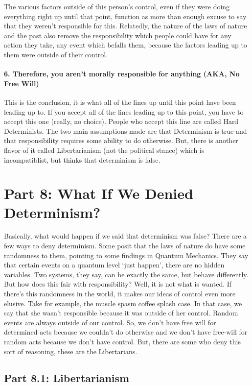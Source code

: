  The various factors outside of this person's control, even if they were doing everything right up until that point, function as more than enough excuse to say that they weren't responsible for this. Relatedly, the nature of the laws of nature and the past also remove the responsibility which people could have for any action they take, any event which befalls them, because the factors leading up to them were outside of their control.
\subsubsection{6. Therefore, you aren't morally responsible for anything (AKA, No Free Will)}

This is the conclusion, it is what all of the lines up until this point have been leading up to. If you accept all of the lines leading up to this point, you have to accept this one (really, no choice).  People who accept this line are called Hard Determinists. The two main assumptions made are that Determinism is true and that responsibility requires some ability to do otherwise. But, there is another flavor of it called Libertarianism (not the political stance) which is incompatiblist, but thinks that determinism is false.

\chapter{Part 8: What If We Denied Determinism?}
Basically, what would happen if we said that determinism was false? There are a few ways to deny determinism. Some posit that the laws of nature do have some randomness to them, pointing to some findings in Quantum Mechanics. They say that certain events on a quantum level ‘just happen’, there are no hidden variables. Two systems, they say, can be exactly the same, but behave differently. But how does this fair with responsibility? Well, it is not what is wanted. If there’s this randomness in the world, it makes our ideas of control even more elusive. Take for example, the muscle spasm coffee splash case. In that case, we say that she wasn't responsible because it was outside of her control. Random events are always outside of our control. So, we don't have free will for determined acts because we couldn't do otherwise and we don't have free-will for random acts because we don't have control.  But, there are some who deny this sort of reasoning, these are the Libertarians.

\section{Part 8.1: Libertarianism}

